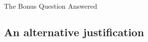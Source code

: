 \documentclass[10pt]{article}
\theoremstyle{definition}
\begin{document}
\begin{section}{The Bonus Question Answered}
\subsection{An alternative justification}

\end{section}
\end{document}

